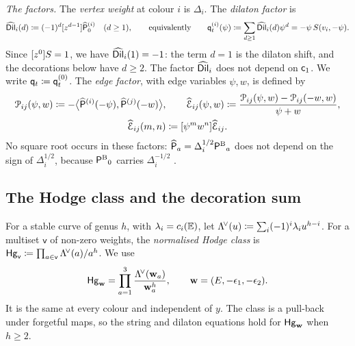 \emph{The factors.} The \emph{vertex weight} at colour $i$ is $\Delta_i$. The \emph{dilaton factor} is
\begin{equation}
\label{eq:set-dil}
\widehat{\mathsf{Dil}}_i(d)\coloneqq(-1)^d[z^{d-1}]\widehat{\mathsf{P}}_0^{(i)}\quad(d\geq1),\qquad\text{equivalently}\qquad
\mathsf{q}_{t}^{(i)}(\psi)\coloneqq\sum_{d\geq1}\widehat{\mathsf{Dil}}_i(d)\psi^d=-\psi\,S(v_i,-\psi).
\end{equation}
Since $[z^0]S=1$, we have $\widehat{\mathsf{Dil}}_i(1)=-1$: the term $d=1$ is the dilaton shift, and the decorations below have $d\geq2$. The factor $\widehat{\mathsf{Dil}}_i$ does not depend on $\mathsf{c}_{1}$. We write $\mathsf{q}_{t}\coloneqq\mathsf{q}_{t}^{(0)}$. The \emph{edge factor}, with edge variables $\psi,w$, is defined by
\begin{equation}
\label{eq:set-edge}
\begin{gathered}
\mathcal{P}_{ij}(\psi,w)\coloneqq-\big\langle\widehat{\mathsf{P}}^{(i)}(-\psi),\widehat{\mathsf{P}}^{(j)}(-w)\big\rangle,\qquad
\widehat{\mathcal{E}}_{ij}(\psi,w)\coloneqq\frac{\mathcal{P}_{ij}(\psi,w)-\mathcal{P}_{ij}(-w,w)}{\psi+w},\\
\widehat{\mathcal{E}}_{ij}(m,n)\coloneqq[\psi^mw^n]\widehat{\mathcal{E}}_{ij}.
\end{gathered}
\end{equation}
No square root occurs in these factors: $\widehat{\mathsf{P}}_a=\Delta_i^{1/2}{\mathsf{P}^{\mathrm{B}}}_a$ does not depend on the sign of $\Delta_i^{1/2}$, because ${\mathsf{P}^{\mathrm{B}}}_0$ carries $\Delta_i^{-1/2}$ .

\subsection{The Hodge class and the decoration sum}
\label{sec:set-graphsum}

For a stable curve of genus $h$, with $\lambda_i=c_i(\mathbb{E})$, let $\Lambda^{\!\vee}(u)\coloneqq\sum_i(-1)^i\lambda_iu^{h-i}$. For a multiset $\mathsf{v}$ of non-zero weights, the \emph{normalised Hodge class} is $\mathsf{Hg}_{\mathsf{v}}\coloneqq\prod_{a\in\mathsf{v}}\Lambda^{\!\vee}(a)/a^h$. We use
\begin{equation}
\label{eq:set-Hg}
\mathsf{Hg}_{\mathbf{w}}=\prod_{a=1}^{3}\frac{\Lambda^{\!\vee}(\mathbf{w}_a)}{\mathbf{w}_a^{h}},\qquad\mathbf{w}=(E,-\epsilon_1,-\epsilon_2).
\end{equation}
It is the same at every colour and independent of $y$. The class is a pull-back under forgetful maps, so the string and dilaton equations hold for $\mathsf{Hg}_{\mathbf{w}}$ when $h\geq2$.

